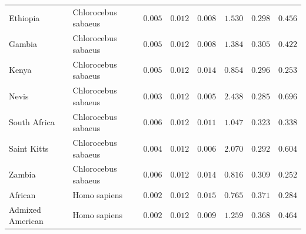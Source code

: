 \documentclass{article}
\begin{document}
\begin{center}
\begin{longtable*}{|l|l|r|r|r|r|r|r|}
             Ethiopia & Chlorocebus sabaeus &               $ 0.005$ &              $ 0.012$ &              $ 0.008$ &                                          $ 1.530$ &                         $ 0.298$ &                      $ 0.456$ \\
             Gambia & Chlorocebus sabaeus &               $ 0.005$ &              $ 0.012$ &              $ 0.008$ &                                          $ 1.384$ &                         $ 0.305$ &                      $ 0.422$ \\
             Kenya & Chlorocebus sabaeus &               $ 0.005$ &              $ 0.012$ &              $ 0.014$ &                                          $ 0.854$ &                         $ 0.296$ &                      $ 0.253$ \\
             Nevis & Chlorocebus sabaeus &               $ 0.003$ &              $ 0.012$ &              $ 0.005$ &                                          $ 2.438$ &                         $ 0.285$ &                      $ 0.696$ \\
             South Africa  & Chlorocebus sabaeus &               $ 0.006$ &              $ 0.012$ &              $ 0.011$ &                                          $ 1.047$ &                         $ 0.323$ &                      $ 0.338$ \\
             Saint Kitts & Chlorocebus sabaeus &               $ 0.004$ &              $ 0.012$ &              $ 0.006$ &                                          $ 2.070$ &                         $ 0.292$ &                      $ 0.604$ \\
             Zambia & Chlorocebus sabaeus &               $ 0.006$ &              $ 0.012$ &              $ 0.014$ &                                          $ 0.816$ &                         $ 0.309$ &                      $ 0.252$ \\
            African &        Homo sapiens &               $ 0.002$ &              $ 0.012$ &              $ 0.015$ &                                          $ 0.765$ &                         $ 0.371$ &                      $ 0.284$ \\
            Admixed American &        Homo sapiens &               $ 0.002$ &              $ 0.012$ &              $ 0.009$ &                                          $ 1.259$ &                         $ 0.368$ &                      $ 0.464$ \\

\end{longtable*}
\end{center}
\end{document}

